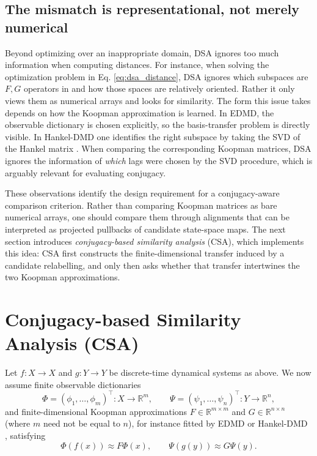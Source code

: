 \documentclass{article}
\theoremstyle{definition}
\begin{document}
\subsection{The mismatch is representational, not merely numerical}
\label{sec:diagnosis-representational}

Beyond optimizing over an inappropriate domain, DSA ignores too much information when computing distances. For instance, when solving the optimization problem in Eq. \eqref{eq:dsa_distance}, DSA ignores which subspaces are $F,G$ operators in and how those spaces are relatively oriented. Rather it only views them as numerical arrays and looks for similarity. The form this issue takes depends on how the Koopman approximation is learned. In EDMD, the observable dictionary is chosen explicitly, so the basis-transfer problem is directly visible. In Hankel-DMD one identifies the right subspace by taking the SVD of the Hankel matrix \citep{arbabi2017ergodic}. When comparing the corresponding Koopman matrices, DSA ignores the information of \textit{which} lags were chosen by the SVD procedure, which is arguably relevant for evaluating conjugacy. 


These observations identify the design requirement for a conjugacy-aware comparison criterion. Rather than comparing Koopman matrices as bare numerical arrays, one should compare them through alignments that can be interpreted as projected pullbacks of candidate state-space maps. The next section introduces \emph{conjugacy-based similarity analysis} (CSA), which implements this idea: CSA first constructs the finite-dimensional transfer induced by a candidate relabelling, and only then asks whether that transfer intertwines the two Koopman approximations.


\section{Conjugacy-based Similarity Analysis (CSA)}
\label{sec:CSA}

Let \(f:X\to X\) and \(g:Y\to Y\) be discrete-time dynamical systems as above. We now assume finite observable dictionaries
\[
    \Phi=(\phi_1,\ldots,\phi_m)^\top:X\to\mathbb R^m,
    \qquad
    \Psi=(\psi_1,\ldots,\psi_n)^\top:Y\to\mathbb R^n,
\]
and finite-dimensional Koopman approximations
\(F\in\mathbb R^{m\times m}\) and \(G\in\mathbb R^{n\times n}\) (where $m$ need not be equal to $n$), for instance fitted by EDMD \citep{williams2015data} or Hankel-DMD \citep{arbabi2017ergodic}, satisfying
\[
    \Phi(f(x))\approx F\Phi(x),
    \qquad
    \Psi(g(y))\approx G\Psi(y).
\]
\end{document}
